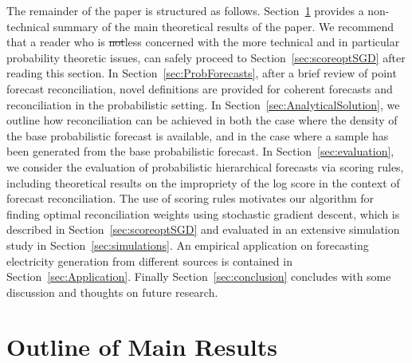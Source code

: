 \documentclass[a4paper,12pt]{article}
\theoremstyle{definition}
\begin{document}
The remainder of the paper is structured as follows.
{\color{red} Section~\ref{sec:theoryoutline} provides a non-technical summary of the main theoretical results of the paper. We recommend that a reader who is \sout{not}less concerned with the more technical and in particular probability theoretic issues, can safely proceed to Section~\ref{sec:scoreoptSGD} after reading this section. } In Section~\ref{sec:ProbForecasts}, after a brief review of point forecast reconciliation, novel definitions are provided for coherent forecasts and reconciliation in the probabilistic setting. In Section~\ref{sec:AnalyticalSolution}, we outline how reconciliation can be achieved in both the case where the density of the base probabilistic forecast is available, and in the case where a sample has been generated from the base probabilistic forecast. In Section~\ref{sec:evaluation}, we consider the evaluation of probabilistic hierarchical forecasts via scoring rules, including theoretical results on the impropriety of the log score in the context of forecast reconciliation. The use of scoring rules motivates our algorithm for finding optimal reconciliation weights using stochastic gradient descent, which is described in Section~\ref{sec:scoreoptSGD} and evaluated in an extensive simulation study in Section~\ref{sec:simulations}. An empirical application on forecasting electricity generation from different sources is contained in Section~\ref{sec:Application}. Finally Section~\ref{sec:conclusion} concludes with some discussion and thoughts on future research.

\section{Outline of Main Results}\label{sec:theoryoutline}
\end{document}
